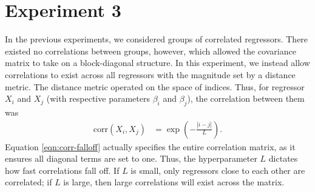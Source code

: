 \documentclass[11pt]{article}
\begin{document}
\section{Experiment 3}
In the previous experiments, we considered groups of correlated regressors. There existed no correlations between groups, however, which allowed the covariance matrix to take on a block-diagonal structure. In this experiment, we instead allow correlations to exist across all regressors with the magnitude set by a distance metric. The distance metric operated on the space of indices. Thus, for regressor $X_i$ and $X_j$ (with respective parameters $\beta_i$ and $\beta_j$), the correlation between them was 
\begin{align}
	\text{corr}(X_i, X_j) &= \exp\left(-\frac{|i-j|}{L}\right). \label{eqn:corr-falloff}
\end{align}
Equation \ref{eqn:corr-falloff} actually specifies the entire correlation matrix, as it ensures all diagonal terms are set to one. Thus, the hyperparameter $L$ dictates how fast correlations fall off. If $L$ is small, only regressors close to each other are correlated; if $L$ is large, then large correlations will exist across the matrix. 
\end{document}
